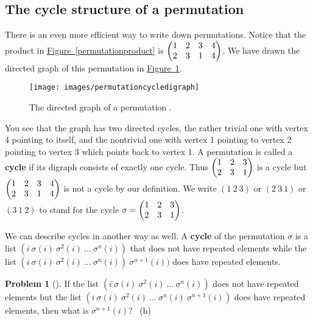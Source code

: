 \documentclass[10pt,]{book}
\newcommand{\terminology}[1]{\textbf{#1}}
\theoremstyle{plain}
\theoremstyle{definition}
\newtheorem{activity}[project]{Problem}
\theoremstyle{definition}
\numberwithin{equation}{chapter}
\newcommand{\amp}{&}
\begin{document}
\subsection[{The cycle structure of a permutation}]{The cycle structure of a permutation}\label{subsection-64}
\hypertarget{p-1548}{}%
There is an even more efficient way to write down permutations. Notice that the product in \hyperref[permutationproduct]{Figure~\ref{permutationproduct}} is \(\begin{pmatrix}1\amp 2\amp 3\amp 4\cr2\amp 3\amp 1\amp 4
\end{pmatrix}\). We have drawn the directed graph of this permutation in \hyperref[permutationcycledigraph]{Figure~\ref{permutationcycledigraph}}.%
\begin{figure}
\centering
\texttt{[image: images/permutationcycledigraph]}
\caption{The directed graph of a permutation .\label{permutationcycledigraph}}
\end{figure}
\hypertarget{p-1549}{}%
You see that the graph has two directed cycles, the rather trivial one with vertex 4 pointing to itself, and the nontrivial one with vertex 1 pointing to vertex 2 pointing to vertex 3 which points back to vertex 1. A permutation is called a \terminology{cycle} if its digraph consists of exactly one cycle. Thus \(\begin{pmatrix}1\amp 2\amp 3\cr2\amp 3\amp 1
\end{pmatrix}\) is a cycle but \(\begin{pmatrix}1\amp 2\amp 3\amp 4\cr2\amp 3\amp 1\amp 4
\end{pmatrix}\) is not a cycle by our definition. We write \((1\ 2\ 3)\) or \((2\ 3\ 1)\) or \((3\ 1\ 2)\) to stand for the cycle \(\sigma =\begin{pmatrix}1\amp 2\amp 3\cr2\amp 3\amp 1
\end{pmatrix}\).%
\par
\hypertarget{p-1550}{}%
We can describe cycles in another way as well. A \terminology{cycle} of the permutation \(\sigma\) is a list \((i\
\sigma(i)\
\sigma^2(i)
\ \ldots\
\sigma^n(i))\) that does not have repeated elements while the list \((i\ \sigma(i)\
\sigma^2(i)\ \ldots\ \sigma^n(i))\ \sigma^{n+1}(i))\) does have repeated elements.%
\begin{activity}[]\marginsymbol[-1em]{} \label{activity-272}
\hypertarget{p-1551}{}%
If the list \((i\ \sigma(i)\ \sigma^2(i)\ \ldots\ \sigma^n(i))\) does not have repeated elements but the list \((i\ \sigma(i)\ \sigma^2(i)\ \ldots\ \sigma^n(i)\ \sigma^{n+1}(i))\) does have repeated elements, then what is \(\sigma^{n+1}(i)\)?%
~{\tiny (h)}\end{activity}
\end{document}
